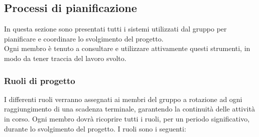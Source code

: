 \subsection{Processi di pianificazione}
In questa sezione sono presentati tutti i sistemi utilizzati dal gruppo per pianificare e coordinare lo svolgimento del progetto. \\
Ogni membro è tenuto a consultare e utilizzare attivamente questi strumenti, in modo da tener traccia del lavoro svolto.

\subsubsection{Ruoli di progetto}
I differenti ruoli verranno assegnati ai membri del gruppo a rotazione ad ogni raggiungimento di una scadenza terminale, garantendo la continuità delle attività in corso. Ogni membro dovrà ricoprire tutti i ruoli, per un periodo significativo, durante lo svolgimento del progetto. I ruoli sono i seguenti:
